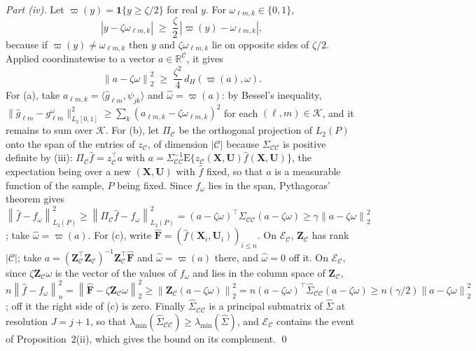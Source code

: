 \documentclass[10pt]{book}
\theoremstyle{definition}
\newcommand{\R}{\mathbb{R}}
\newcommand{\E}{\mathrm{E}}
\newcommand{\T}{^{\top}}
\newcommand{\norm}[1]{\left\lVert #1 \right\rVert}
\newcommand{\normn}[1]{\left\lVert #1 \right\rVert_{n}}
\newcommand{\inner}[2]{\langle #1, #2 \rangle}
\newcommand{\cv}{\ell}
\newcommand{\md}{m}
\newcommand{\lev}{j}
\newcommand{\tsl}{k}
\newcommand{\bX}{\mathbf{X}}
\newcommand{\bU}{\mathbf{U}}
\newcommand{\bZ}{\mathbf{Z}}
\newcommand{\gcomp}[2]{g_{#1#2}}
\newcommand{\wav}[2]{\psi_{#1#2}}
\newcommand{\Gram}{\Sigma}
\newcommand{\Gramhat}{\widehat{\Sigma}}
\newcommand{\lmin}{\lambda_{\min}}
\newcommand{\Kcal}{\mathcal{K}}
\begin{document}
{\emph{Part (iv).} Let $\varpi(y) = \mathbf{1}\{y \ge \zeta/2\}$ for real $y$.
For $\omega_{\cv\md,\tsl} \in \{0,1\}$,
\begin{equation}
  \label{eq:hypercube-threshold}
  |y - \zeta\omega_{\cv\md,\tsl}| \;\ge\; \frac{\zeta}{2}\,
  |\varpi(y) - \omega_{\cv\md,\tsl}| ,
\end{equation}
because if $\varpi(y) \ne \omega_{\cv\md,\tsl}$ then $y$ and
$\zeta\omega_{\cv\md,\tsl}$ lie on opposite sides of $\zeta/2$. Applied
coordinatewise to a vector $a \in \R^{\mathcal{C}}$, it gives
\[
  \norm{a-\zeta\omega}_{2}^{2} \;\ge\; \frac{\zeta^{2}}{4}\,d_{H}(\varpi(a),\omega) .
\]
For
(a), take $a_{\cv\md,\tsl} = \inner{\widehat{g}_{\cv\md}}{\wav{\lev}{\tsl}}$
and $\widehat\omega = \varpi(a)$: by Bessel's inequality,
$\lVert\widehat{g}_{\cv\md}-\gcomp{\cv}{\md}^{\omega}\rVert_{L_2[0,1]}^{2} \ge
\sum_{\tsl}(a_{\cv\md,\tsl}-\zeta\omega_{\cv\md,\tsl})^{2}$ for each
$(\cv,\md) \in \Kcal$, and it remains to sum over $\Kcal$. For (b), let
$\Pi_{\mathcal{C}}$ be the orthogonal projection of $L_2(P)$ onto the span of
the entries of $z_{\mathcal{C}}$, of dimension $|\mathcal{C}|$ because
$\Gram_{\mathcal{C}\mathcal{C}}$ is positive definite by (iii):
$\Pi_{\mathcal{C}}\widehat{f} = z_{\mathcal{C}}\T a$ with
$a = \Gram_{\mathcal{C}\mathcal{C}}^{-1}\E\{z_{\mathcal{C}}(\bX,\bU)\widehat{f}(\bX,\bU)\}$,
the expectation being over a new $(\bX,\bU)$ with $\widehat{f}$ fixed, so that
$a$ is a measurable function of the sample, $P$ being fixed. Since $f_{\omega}$
lies in the span, Pythagoras' theorem gives
$\norm{\widehat{f}-f_{\omega}}_{L_2(P)}^{2} \ge
\norm{\Pi_{\mathcal{C}}\widehat{f}-f_{\omega}}_{L_2(P)}^{2} =
(a-\zeta\omega)\T\Gram_{\mathcal{C}\mathcal{C}}(a-\zeta\omega) \ge
\gamma\norm{a-\zeta\omega}_{2}^{2}$; take $\widehat\omega = \varpi(a)$. For
(c), write $\widehat{\mathbf{F}} = (\widehat{f}(\bX_i,\bU_i))_{i\le n}$. On
$\mathcal{E}_{\mathcal{C}}$, $\bZ_{\mathcal{C}}$ has rank $|\mathcal{C}|$; take
$a = (\bZ_{\mathcal{C}}\T\bZ_{\mathcal{C}})^{-1}\bZ_{\mathcal{C}}\T\widehat{\mathbf{F}}$
and $\widehat\omega = \varpi(a)$ there, and $\widehat\omega = 0$ off it. On
$\mathcal{E}_{\mathcal{C}}$, since $\zeta\bZ_{\mathcal{C}}\omega$ is the vector
of the values of $f_{\omega}$ and lies in the column space of
$\bZ_{\mathcal{C}}$,
$n\normn{\widehat{f}-f_{\omega}}^{2} =
\norm{\widehat{\mathbf{F}}-\zeta\bZ_{\mathcal{C}}\omega}_{2}^{2} \ge
\norm{\bZ_{\mathcal{C}}(a-\zeta\omega)}_{2}^{2} =
n(a-\zeta\omega)\T\Gramhat_{\mathcal{C}\mathcal{C}}(a-\zeta\omega) \ge
n(\gamma/2)\norm{a-\zeta\omega}_{2}^{2}$; off it the right side of (c) is
zero. Finally $\Gramhat_{\mathcal{C}\mathcal{C}}$ is a principal submatrix of
$\Gramhat$ at resolution $J = \lev+1$, so that
$\lmin(\Gramhat_{\mathcal{C}\mathcal{C}}) \ge \lmin(\Gramhat)$, and
$\mathcal{E}_{\mathcal{C}}$ contains the event of Proposition~2(ii), which
gives the bound on its complement. \qed

}
\end{document}
